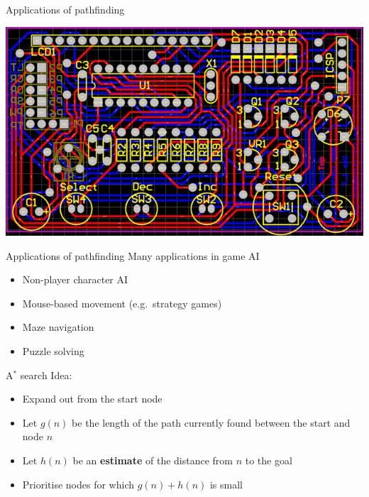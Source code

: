 \begin{frame}{Applications of pathfinding}
    \begin{center}
        \includegraphics[width=\textwidth]{pcb}
    \end{center}
\end{frame}

\begin{frame}{Applications of pathfinding}
    Many applications in game AI \pause
    \begin{itemize}
        \item Non-player character AI \pause
        \item Mouse-based movement (e.g.\ strategy games) \pause
        \item Maze navigation \pause
        \item Puzzle solving
    \end{itemize}
\end{frame}

\begin{frame}{A$^*$ search}
    Idea: \pause
    \begin{itemize}
        \item Expand out from the start node \pause
        \item Let $g(n)$ be the length of the path currently found between the start and node $n$ \pause
        \item Let $h(n)$ be an \textbf{estimate} of the distance from $n$ to the goal \pause
        \item Prioritise nodes for which $g(n) + h(n)$ is small
    \end{itemize}
\end{frame}

